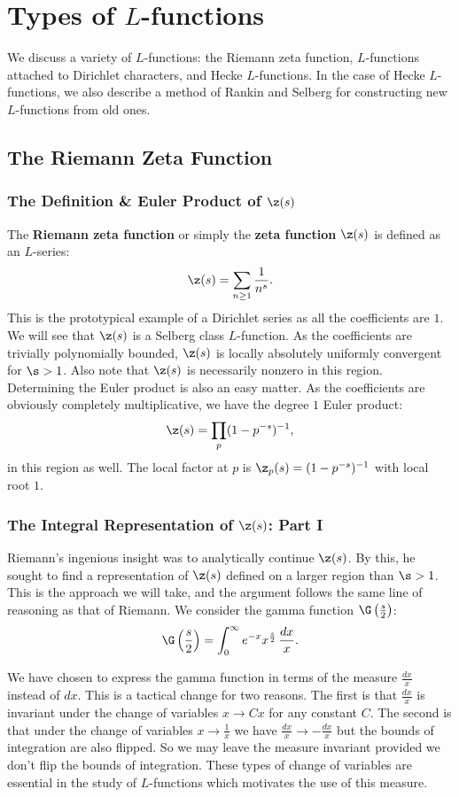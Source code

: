 \chapter{Types of \texorpdfstring{$L$}{L}-functions}
  We discuss a variety of $L$-functions: the Riemann zeta function, $L$-functions attached to Dirichlet characters, and Hecke $L$-functions. In the case of Hecke $L$-functions, we also describe a method of Rankin and Selberg for constructing new $L$-functions from old ones.
  \section{The Riemann Zeta Function}
    \subsection*{The Definition \& Euler Product of \texorpdfstring{$\z(s)$}{\z(s)}}
      The \textbf{Riemann zeta function} or simply the \textbf{zeta function} $\z(s)$ is defined as an $L$-series:
      \[
        \z(s) = \sum_{n \ge 1}\frac{1}{n^{s}}.
      \]
      This is the prototypical example of a Dirichlet series as all the coefficients are $1$. We will see that $\z(s)$ is a Selberg class $L$-function. As the coefficients are trivially polynomially bounded, $\z(s)$ is locally absolutely uniformly convergent for $\s > 1$. Also note that $\z(s)$ is necessarily nonzero in this region. Determining the Euler product is also an easy matter. As the coefficients are obviously completely multiplicative, we have the degree $1$ Euler product:
      \[
        \z(s) = \prod_{p}(1-p^{-s})^{-1},
      \]
      in this region as well. The local factor at $p$ is $\z_{p}(s) = (1-p^{-s})^{-1}$ with local root $1$.
    \subsection*{The Integral Representation of \texorpdfstring{$\z(s)$}{\z(s)}: Part I}
      Riemann's ingenious insight was to analytically continue $\z(s)$. By this, he sought to find a representation of $\z(s)$ defined on a larger region than $\s > 1$. This is the approach we will take, and the argument follows the same line of reasoning as that of Riemann. We consider the gamma function $\G\left(\frac{s}{2}\right)$:
      \[
        \G\left(\frac{s}{2}\right) = \int_{0}^{\infty}e^{-x}x^{\frac{s}{2}}\,\frac{dx}{x}.
      \]

      \begin{remark}
        We have chosen to express the gamma function in terms of the measure $\frac{dx}{x}$ instead of $dx$. This is a tactical change for two reasons. The first is that $\frac{dx}{x}$ is invariant under the change of variables $x \to Cx$ for any constant $C$. The second is that under the change of variables $x \to \frac{1}{x}$ we have $\frac{dx}{x} \to -\frac{dx}{x}$ but the bounds of integration are also flipped. So we may leave the measure invariant provided we don't flip the bounds of integration. These types of change of variables are essential in the study of $L$-functions which motivates the use of this measure.
      \end{remark}

